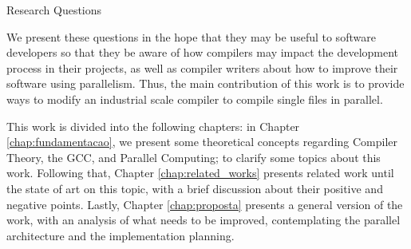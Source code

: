 \begin{section}{Research Questions}

We present these questions in the hope that they may be useful to software
developers so that they be aware of how compilers may impact the development
process in their projects, as well as compiler writers about how to improve
their software using parallelism. Thus, the main contribution of this work is
to provide ways to modify an industrial scale compiler to
compile single files in parallel.

This work is divided into the following chapters: in Chapter
\ref{chap:fundamentacao}, we present some theoretical concepts regarding
Compiler Theory, the GCC,  and Parallel Computing; to clarify some topics about this work.
Following that, Chapter \ref{chap:related_works} presents related work until
the state of art on this topic, with a brief discussion about their positive
and negative points.  Lastly, Chapter \ref{chap:proposta} presents a general
version of the work, with an analysis of what needs to be improved,
contemplating the parallel architecture and the implementation planning.



\end{section}
